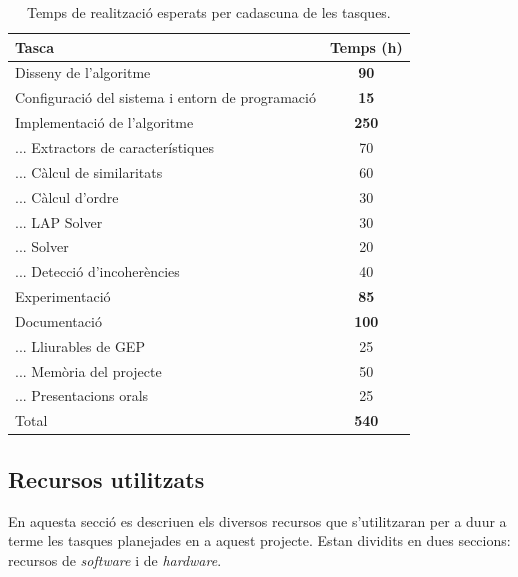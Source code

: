 \documentclass[10pt,a4paper]{article}
\begin{document}
\begin{table}[!htb]
\begin{center}
\begin{tabular}{|l||c|}
     \hline
     Tasca & Temps (h) \\
     \hline
     \hline
     Disseny de l'algoritme & \textbf{90}\\
     \hline 
     Configuració del sistema i entorn de programació & \textbf{15}\\
     \hline 
     Implementació de l'algoritme & \textbf{250}\\
     
     ... Extractors de característiques & 70 \\
     
     ... Càlcul de similaritats & 60 \\
     
     ... Càlcul d'ordre & 30 \\
     
     ... LAP Solver & 30 \\
     
     ... Solver & 20 \\
     
     ... Detecció d'incoherències & 40 \\
     \hline 
     Experimentació & \textbf{85}\\
     \hline 
     Documentació & \textbf{100}\\
     
     ... Lliurables de GEP & 25\\
     
     ... Memòria del projecte & 50\\
     
     ... Presentacions orals & 25 \\
     \hline
     \hline 
     Total &  \textbf{540}\\
     \hline
\end{tabular}
\end{center}
    \caption{Temps de realització esperats per cadascuna de les tasques.}
    \label{tab:timetable}
\end{table}


\subsection{Recursos utilitzats}
\label{recursos}

En aquesta secció es descriuen els diversos recursos que s'utilitzaran per a duur a terme les tasques planejades en a aquest projecte. Estan dividits en dues seccions: recursos de \emph{software} i de \emph{hardware}.
\end{document}
